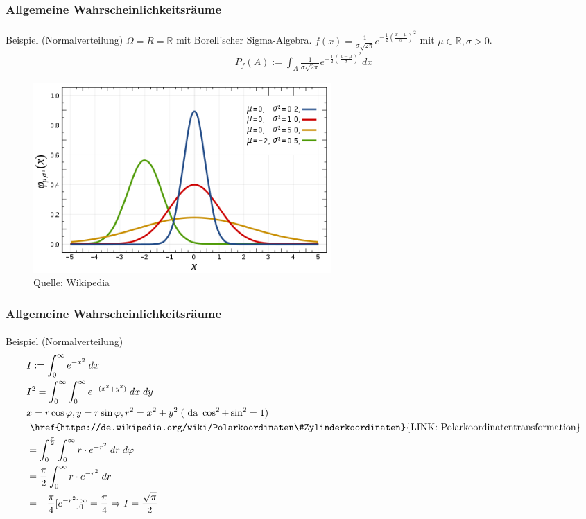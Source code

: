 \documentclass{beamer}
\begin{document}
\begin{frame}
    \frametitle{Allgemeine Wahrscheinlichkeitsräume}
\framesubtitle{}
\begin{block}{Beispiel (Normalverteilung)}
$\Omega = R = \mathbb{R}$ mit Borell'scher Sigma-Algebra. 
$ f(x) = \frac 1{\sigma \sqrt{2\pi}}e^{- \frac {1}{2} (\frac{x- \mu}{ \sigma})^2}$ mit $\mu \in \mathbb{R}, \sigma > 0 $.
\begin{align*}
P_f (A) := \int_{A}  \frac 1{\sigma \sqrt{2\pi}}e^{- \frac {1}{2} (\frac{x- \mu}{ \sigma})^2}dx
\end{align*}

\end{block}

\begin{figure}[htp]
      \centering
    \includegraphics[width=0.55\textwidth]{img/normal}
      \caption{Quelle: Wikipedia}
\end{figure}


 \end{frame}

\begin{frame}
    \frametitle{Allgemeine Wahrscheinlichkeitsräume}
\framesubtitle{}
\begin{block}{Beispiel (Normalverteilung)}
\begin{align*}
& I := \int_{0}^{\infty} e^{-x^2} \; dx\\
& I^2 = \int_{0}^{\infty} \int_{0}^{\infty} e^{-(x^2+y^2)} \; dx \;dy \\
&x=r \cos \varphi ,y=r\sin \varphi ,r^2 = x^2 + y^2  \; (\text{ da } \cos^2 + \sin^2 = 1)\\
 &\text{ \href{https://de.wikipedia.org/wiki/Polarkoordinaten\#Zylinderkoordinaten}{LINK: Polarkoordinatentransformation}} \\
& = \int_{0}^{\frac{\pi}{2}}  \int_{0}^{\infty}r \cdot e^{-r^2} \; dr \;d\varphi \\
&= \frac{\pi}{2} \int_{0}^{\infty}r \cdot e^{-r^2} \; dr \\
&= -\frac{\pi}{4} [e^{-r^2} ]_0^{\infty} = \frac{\pi}{4} \Rightarrow I = \frac{\sqrt{\pi}}{2}
\end{align*}
\end{block}



 \end{frame}
\end{document}
